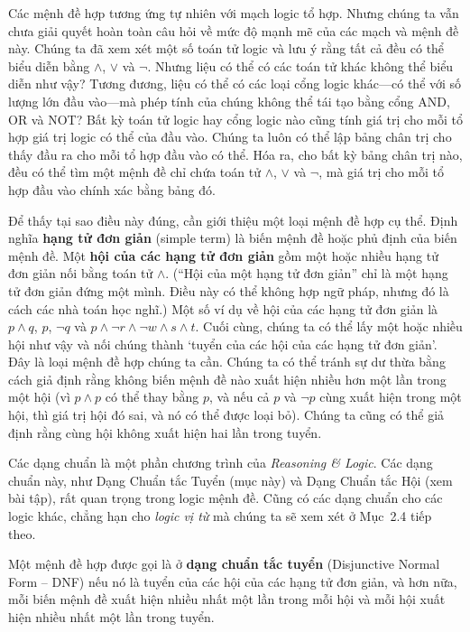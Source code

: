 Các mệnh đề hợp tương ứng tự nhiên với mạch logic tổ hợp. Nhưng chúng ta vẫn chưa giải quyết hoàn toàn câu hỏi về mức độ mạnh mẽ của các mạch và mệnh đề này. Chúng ta đã xem xét một số toán tử logic và lưu ý rằng tất cả đều có thể biểu diễn bằng $\land$, $\lor$ và $\lnot$. Nhưng liệu có thể có các toán tử khác không thể biểu diễn như vậy? Tương đương, liệu có thể có các loại cổng logic khác---có thể với số lượng lớn đầu vào---mà phép tính của chúng không thể tái tạo bằng cổng AND, OR và NOT? Bất kỳ toán tử logic hay cổng logic nào cũng tính giá trị cho mỗi tổ hợp giá trị logic có thể của đầu vào. Chúng ta luôn có thể lập bảng chân trị cho thấy đầu ra cho mỗi tổ hợp đầu vào có thể. Hóa ra, cho bất kỳ bảng chân trị nào, đều có thể tìm một mệnh đề chỉ chứa toán tử $\land$, $\lor$ và $\lnot$, mà giá trị cho mỗi tổ hợp đầu vào chính xác bằng bảng đó.

Để thấy tại sao điều này đúng, cần giới thiệu một loại mệnh đề hợp cụ thể. Định nghĩa \textbf{hạng tử đơn giản} (simple term) là biến mệnh đề hoặc phủ định của biến mệnh đề. Một \textbf{hội của các hạng tử đơn giản} gồm một hoặc nhiều hạng tử đơn giản nối bằng toán tử $\land$. (``Hội của một hạng tử đơn giản'' chỉ là một hạng tử đơn giản đứng một mình. Điều này có thể không hợp ngữ pháp, nhưng đó là cách các nhà toán học nghĩ.) Một số ví dụ về hội của các hạng tử đơn giản là $p \land q$, $p$, $\lnot q$ và $p \land \lnot r \land \lnot w \land s \land t$. Cuối cùng, chúng ta có thể lấy một hoặc nhiều hội như vậy và nối chúng thành `tuyển của các hội của các hạng tử đơn giản'. Đây là loại mệnh đề hợp chúng ta cần. Chúng ta có thể tránh sự dư thừa bằng cách giả định rằng không biến mệnh đề nào xuất hiện nhiều hơn một lần trong một hội (vì $p \land p$ có thể thay bằng $p$, và nếu cả $p$ và $\lnot p$ cùng xuất hiện trong một hội, thì giá trị hội đó sai, và nó có thể được loại bỏ). Chúng ta cũng có thể giả định rằng cùng hội không xuất hiện hai lần trong tuyển.

\begin{warningbox}
Các dạng chuẩn là một phần chương trình của \emph{Reasoning \& Logic}. Các dạng chuẩn này, như Dạng Chuẩn tắc Tuyển (mục này) và Dạng Chuẩn tắc Hội (xem bài tập), rất quan trọng trong logic mệnh đề. Cũng có các dạng chuẩn cho các logic khác, chẳng hạn cho \emph{logic vị từ} mà chúng ta sẽ xem xét ở Mục~2.4 tiếp theo.
\end{warningbox}

\begin{definition}
Một mệnh đề hợp được gọi là ở \textbf{dạng chuẩn tắc tuyển} (Disjunctive Normal Form -- DNF) nếu nó là tuyển của các hội của các hạng tử đơn giản, và hơn nữa, mỗi biến mệnh đề xuất hiện nhiều nhất một lần trong mỗi hội và mỗi hội xuất hiện nhiều nhất một lần trong tuyển.
\end{definition}

